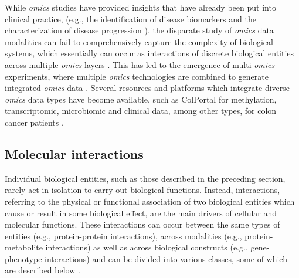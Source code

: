 While \textit{omics} studies have provided insights that have already been put into clinical practice, (e.g., the identification of disease biomarkers \parencite{kim2010, baylin2001} and the characterization of disease progression \parencite{govender2021}), the disparate study of \textit{omics} data modalities can fail to comprehensively capture the complexity of biological systems, which essentially can occur as interactions of discrete biological entities across multiple \textit{omics} layers \parencite{yugi2016}. This has led to the emergence of multi-\textit{omics} experiments, where multiple \textit{omics} technologies are combined to generate integrated \textit{omics} data \parencite{karczewski2018,misra2019,hasin2017}. Several resources and platforms which integrate diverse \textit{omics} data types have become available, such as ColPortal for methylation, transcriptomic, microbiomic and clinical data, among other types, for colon cancer patients \parencite{esteban2019, conesa2019}.

\subsection{Molecular interactions} \label{interactions}

Individual biological entities, such as those described in the preceding section, rarely act in isolation to carry out biological functions. Instead, interactions, referring to the physical or functional association of two biological entities which cause or result in some biological effect, are the main drivers of cellular and molecular functions. These interactions can occur between the same types of entities (e.g., protein-protein interactions), across modalities (e.g., protein-metabolite interactions) as well as across biological constructs (e.g., gene-phenotype interactions) and can be divided into various classes, some of which are described below \parencite{gomez2020,sonawane2019,hawe2019}.

